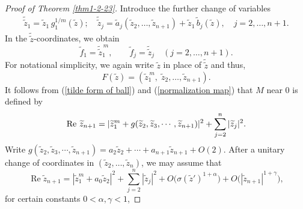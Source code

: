 \documentclass[a4paper,centertags,oneside,12pt]{amsart}
\numberwithin{equation}{section}
\begin{document}
\begin{proof}[Proof of Theorem \ref{thm1-2-23}]
Introduce the further change of variables
\[
\begin{aligned}
\widetilde{\widetilde z}_1 = \widetilde z_1 \, g_1^{1/m}(\widetilde z);\quad
\widetilde{\widetilde z}_j= \widetilde a_j(\widetilde z_2, \dots, \widetilde z_{n+1}) + \widetilde z_1 \, \widetilde b_j(\widetilde z), \quad j=2,\dots, n+1.
\end{aligned}
\]
In the \(\widetilde{\widetilde z}\)-coordinates, we obtain
\[
\widetilde f_1 = \widetilde{\widetilde z}_1^{\,m}, \qquad 
\widetilde f_j = \widetilde{\widetilde z}_j \quad (j=2,\dots,n+1).
\]
For notational simplicity, we again write  \(\widetilde z\) in place of \(\widetilde{\widetilde z}\) and thus,
\begin{equation}\label{normalization map}
 F(\widetilde z) = (\widetilde z_1^{\,m},\; \widetilde z_2,\dots, \widetilde z_{n+1}).
\end{equation}
It follows from (\ref{tilde form of ball})  and (\ref{normalization map}) that $M$ near $0$  is  defined by 
\begin{equation*}
    {\rm Re}~\widetilde z_{n+1}=|\widetilde z_1^m+g(\widetilde z_2, \widetilde z_3, \cdots, \widetilde z_{n+1})|^2+\sum_{j=2}^{n}|\widetilde z_j|^2.
\end{equation*}
Write $g(\widetilde z_2, \widetilde z_3, \cdots, \widetilde z_{n+1})=a_2\widetilde z_2+\cdots+a_{n+1}\widetilde z_{n+1}+ O(2).$
After a unitary change of coordinates in \((\widetilde z_2, \dots, \widetilde z_{n})\), we may assume that  
\begin{equation*}
    \operatorname{Re}\widetilde z_{n+1} = |\widetilde z_1^m + a_0 \widetilde z_2|^2 + \sum_{j=2}^{n} |\widetilde z_j|^2 + O\bigl(\sigma(\widetilde z')^{1+\alpha}\big)+O\big(|\widetilde z_{n+1}|^{1+\gamma}\bigr),
\end{equation*}
for  certain constants $0<\alpha, \gamma<1$,

\end{proof}
\end{document}
